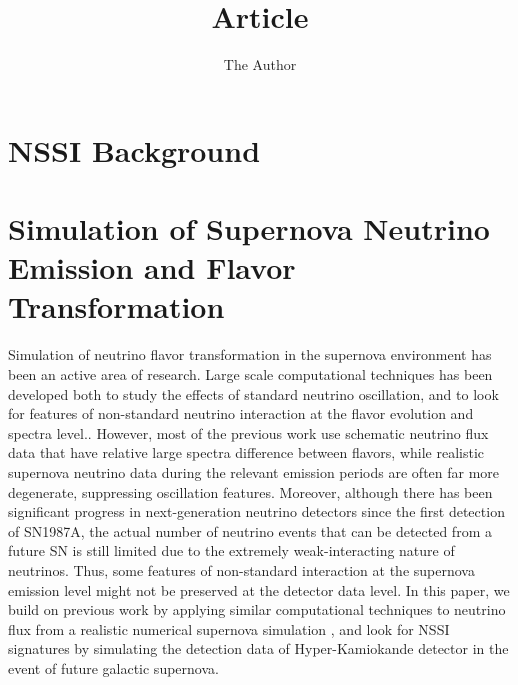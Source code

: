 \documentclass[11pt, oneside]{article}   	%
\title{Article}
\author{The Author}
\begin{document}

\section{NSSI Background}

\section{Simulation of Supernova Neutrino Emission and Flavor Transformation}
Simulation of neutrino flavor transformation in the supernova environment has been an active area of research. Large scale computational techniques has been developed both to study the effects of standard neutrino oscillation\cite{Duan1, Duan2}, and to look for features of non-standard neutrino interaction at the flavor evolution and spectra level.\cite{Blennow}. However, most of the previous work use schematic neutrino flux data that have relative large spectra difference between flavors, while realistic supernova neutrino data during the relevant emission periods are often far more degenerate, suppressing oscillation features. Moreover, although there has been significant progress in next-generation neutrino detectors since the first detection of SN1987A, the actual number of neutrino events that can be detected from a future SN is still limited due to the extremely weak-interacting nature of neutrinos. Thus, some features of non-standard interaction at the supernova emission level might not be preserved at the detector data level. In this paper, we build on previous work by applying similar computational techniques to neutrino flux from a realistic numerical supernova simulation \cite{Nakasato}, and look for NSSI signatures by simulating the detection data of Hyper-Kamiokande detector \cite{HK} in the event of future galactic supernova.
\end{document}

